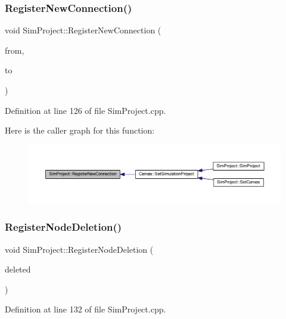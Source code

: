 \subsubsection{\texorpdfstring{Register\+New\+Connection()}{RegisterNewConnection()}}
{\footnotesize\ttfamily void Sim\+Project\+::\+Register\+New\+Connection (\begin{DoxyParamCaption}\item[{\hyperlink{class_graphical_node}{Graphical\+Node} $\ast$}]{from,  }\item[{\hyperlink{class_graphical_node}{Graphical\+Node} $\ast$}]{to }\end{DoxyParamCaption})}



Definition at line 126 of file Sim\+Project.\+cpp.

Here is the caller graph for this function\+:
\nopagebreak
\begin{figure}[H]
\begin{center}
\leavevmode
\includegraphics[width=350pt]{class_sim_project_a37b86538831e7d1e814971c70dce1a54_icgraph}
\end{center}
\end{figure}
\mbox{\label{class_sim_project_ab35e169ce5201aeaa7a251a0d043d7f6}} 
\subsubsection{\texorpdfstring{Register\+Node\+Deletion()}{RegisterNodeDeletion()}}
{\footnotesize\ttfamily void Sim\+Project\+::\+Register\+Node\+Deletion (\begin{DoxyParamCaption}\item[{\hyperlink{class_graphical_node}{Graphical\+Node} $\ast$}]{deleted }\end{DoxyParamCaption})}



Definition at line 132 of file Sim\+Project.\+cpp.

